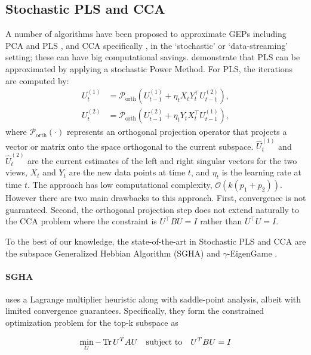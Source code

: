 \subsection{Stochastic PLS and CCA}
A number of algorithms have been proposed to approximate GEPs including PCA and PLS \citep{arora2012stochastic}, and CCA specifically \citep{bhatia2018gen}, in the `stochastic' or `data-streaming' setting; these can have big computational savings.
\citet{arora2016stochastic} demonstrate that PLS can be approximated by applying a stochastic Power Method. For PLS, the iterations are computed by:
\begin{align*}
    U^{(1)}_t &= \mathcal{P}_{\text{orth}} \left( U^{(1)}_{t-1} + \eta_t X_t Y_t^\top U^{(2)}_{t-1} \right), \\
    U^{(2)}_t &= \mathcal{P}_{\text{orth}} \left( U^{(2)}_{t-1} + \eta_t Y_t X_t^\top U^{(1)}_{t-1} \right),
\end{align*}
where \( \mathcal{P}_{\text{orth}}(\cdot) \) represents an orthogonal projection operator that projects a vector or matrix onto the space orthogonal to the current subspace. \( \hat{U}^{(1)}_t \) and \( \hat{U}^{(2)}_t \) are the current estimates of the left and right singular vectors for the two views, \( X_t \) and \( Y_t \) are the new data points at time \( t \), and \( \eta_t \) is the learning rate at time \( t \).
The approach has low computational complexity, $\mathcal{O}(k(p_1+ p_2))$.
However there are two main drawbacks to this approach.
First, convergence is not guaranteed.
Second, the orthogonal projection step does not extend naturally to the CCA problem where the constraint is \( U^\top B U = I \) rather than \( U^\top U = I \).


To the best of our knowledge, the state-of-the-art in Stochastic PLS and CCA are the subspace Generalized Hebbian Algorithm (SGHA) \citep{chen2019constrained} and $\gamma$-EigenGame \citep{gemp20,gemp2021}.
\paragraph{SGHA} uses a Lagrange multiplier heuristic along with saddle-point analysis, albeit with limited convergence guarantees.
Specifically, they form the constrained optimization problem for the top-k subspace as

\begin{align}
    \min_{U} -\operatorname{Tr} U^T A U \quad \text{subject to} \quad U^T B U = I
\end{align}

